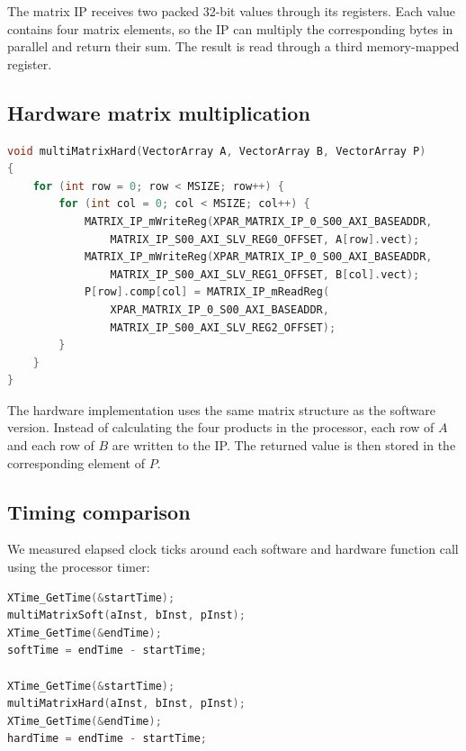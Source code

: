 \documentclass[12pt]{article}
\begin{document}
The matrix IP receives two packed 32-bit values through its registers. Each
value contains four matrix elements, so the IP can multiply the corresponding
bytes in parallel and return their sum. The result is read through a third
memory-mapped register.

\subsection*{Hardware matrix multiplication}

\begin{lstlisting}[language=C,caption={Writing matrix rows to the IP and reading each result}]
void multiMatrixHard(VectorArray A, VectorArray B, VectorArray P)
{
    for (int row = 0; row < MSIZE; row++) {
        for (int col = 0; col < MSIZE; col++) {
            MATRIX_IP_mWriteReg(XPAR_MATRIX_IP_0_S00_AXI_BASEADDR,
                MATRIX_IP_S00_AXI_SLV_REG0_OFFSET, A[row].vect);
            MATRIX_IP_mWriteReg(XPAR_MATRIX_IP_0_S00_AXI_BASEADDR,
                MATRIX_IP_S00_AXI_SLV_REG1_OFFSET, B[col].vect);
            P[row].comp[col] = MATRIX_IP_mReadReg(
                XPAR_MATRIX_IP_0_S00_AXI_BASEADDR,
                MATRIX_IP_S00_AXI_SLV_REG2_OFFSET);
        }
    }
}
\end{lstlisting}

The hardware implementation uses the same matrix structure as the software
version. Instead of calculating the four products in the processor, each row of
$A$ and each row of $B$ are written to the IP. The returned value is then
stored in the corresponding element of $P$.

\subsection*{Timing comparison}

We measured elapsed clock ticks around each software and hardware function call
using the processor timer:
\begin{lstlisting}[language=C,caption={Measuring software and hardware execution time}]
XTime_GetTime(&startTime);
multiMatrixSoft(aInst, bInst, pInst);
XTime_GetTime(&endTime);
softTime = endTime - startTime;

XTime_GetTime(&startTime);
multiMatrixHard(aInst, bInst, pInst);
XTime_GetTime(&endTime);
hardTime = endTime - startTime;
\end{lstlisting}
\end{document}
